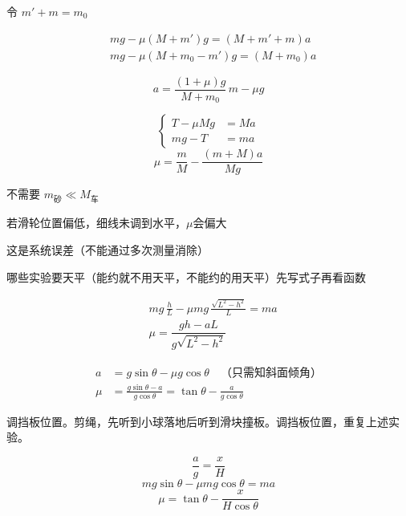 令 $m'+m=m_0$

\begin{align*}
& mg-\mu(M+m')g=(M+m'+m)a \\
& mg-\mu(M+m_0-m')g=(M+m_0)a %
\end{align*}

\[
a=\dfrac{(1+\mu)g}{M+m_0}\,m-\mu g %
\]



\[
\left\{\begin{aligned}
T-\mu Mg&=Ma\\
mg-T&=ma
\end{aligned}\right.
\]
\[ \mu=\frac{m}{M}-\frac{(m+M)a}{Mg} \]

不需要 $m_{\text{砂}}\ll M_{\text{车}}$ %

若滑轮位置偏低，细线未调到水平，$\mu$会偏大

这是系统误差（不能通过多次测量消除）

哪些实验要天平（能约就不用天平，不能约的用天平）\qquad 先写式子再看函数


\begin{align*}
& mg\,\frac{h}{L}-\mu mg\,\frac{\sqrt{L^2-h^2}}{L}=ma \\
& \mu=\dfrac{gh-aL}{g\sqrt{L^2-h^2}}
\end{align*}


\begin{align*}
a&=g\sin\theta-\mu g\cos\theta\quad\text{（只需知斜面倾角）}\\
\mu&=\frac{g\sin\theta-a}{g\cos\theta}=\tan\theta-\frac{a}{g\cos\theta}
\end{align*}

调挡板位置。剪绳，先听到小球落地后听到滑块撞板。调挡板位置，重复上述实验。


\[ \frac{a}{g}=\frac{x}{H} \]
\[ mg\sin\theta-\mu mg\cos\theta=ma \]
\[ \mu=\tan\theta-\frac{x}{H\cos\theta} \]

